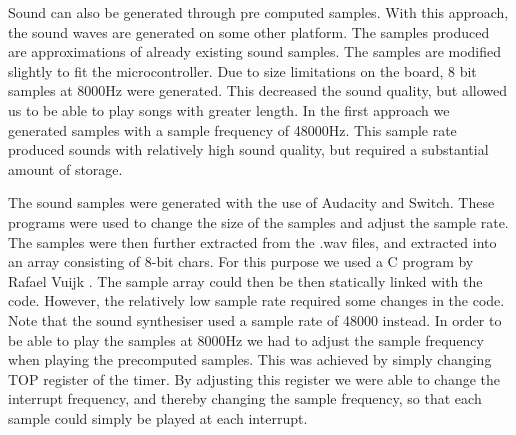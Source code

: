 
Sound can also be generated through pre computed samples. With this approach, the sound waves are generated on some other platform. The samples produced are approximations of already existing sound samples. The samples are modified slightly to fit the microcontroller. Due to size limitations on the board, 8 bit samples at 8000Hz were generated. This decreased the sound quality, but allowed us to be able to play songs with greater length. In the first approach we generated samples with a sample frequency of 48000Hz. This sample rate produced sounds with relatively high sound quality, but required a substantial amount of storage.

The sound samples were generated with the use of Audacity\cite{audacity} and Switch\cite{switch}. These programs were used to change the size of the samples and adjust the sample rate. The samples were then further extracted from the .wav files, and extracted into an array consisting of 8-bit chars. For this purpose we used a C program by Rafael Vuijk \cite{darkfader}. The sample array could then be then statically linked with the code. However, the relatively low sample rate required some changes in the code. Note that the sound synthesiser used a sample rate of 48000 instead. In order to be able to play the samples at 8000Hz we had to adjust the sample frequency when playing the precomputed samples. This was achieved by simply changing TOP register of the timer. By adjusting this register we were able to change the interrupt frequency, and thereby changing the sample frequency, so that each sample could simply be played at each interrupt.  



  











